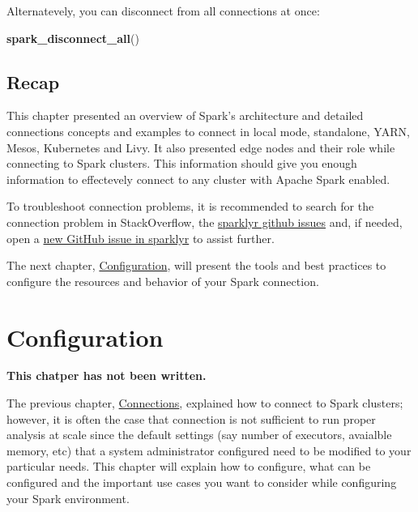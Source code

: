 \documentclass[]{book}
\newenvironment{Shaded}{\begin{snugshade}}{\end{snugshade}}
\newcommand{\KeywordTok}[1]{\textcolor[rgb]{0.13,0.29,0.53}{\textbf{#1}}}
\newcommand{\NormalTok}[1]{#1}
\theoremstyle{definition}
\theoremstyle{definition}
\theoremstyle{definition}
\theoremstyle{remark}
\begin{document}
Alternatevely, you can disconnect from all connections at once:

\begin{Shaded}
\begin{Highlighting}[]
\KeywordTok{spark_disconnect_all}\NormalTok{()}
\end{Highlighting}
\end{Shaded}

\hypertarget{recap-2}{%
\section{Recap}\label{recap-2}}

This chapter presented an overview of Spark's architecture and detailed
connections concepts and examples to connect in local mode, standalone,
YARN, Mesos, Kubernetes and Livy. It also presented edge nodes and their
role while connecting to Spark clusters. This information should give
you enough information to effectevely connect to any cluster with Apache
Spark enabled.

To troubleshoot connection problems, it is recommended to search for the
connection problem in StackOverflow, the
\href{https://github.com/rstudio/sparklyr/issues}{sparklyr github
issues} and, if needed, open a
\href{https://github.com/rstudio/sparklyr/issues/new}{new GitHub issue
in sparklyr} to assist further.

The next chapter, \protect\hyperlink{configuration}{Configuration}, will
present the tools and best practices to configure the resources and
behavior of your Spark connection.

\hypertarget{configuration}{%
\chapter{Configuration}\label{configuration}}

\textbf{This chatper has not been written.}

The previous chapter, \protect\hyperlink{connections-1}{Connections},
explained how to connect to Spark clusters; however, it is often the
case that connection is not sufficient to run proper analysis at scale
since the default settings (say number of executors, avaialble memory,
etc) that a system administrator configured need to be modified to your
particular needs. This chapter will explain how to configure, what can
be configured and the important use cases you want to consider while
configuring your Spark environment.
\end{document}
